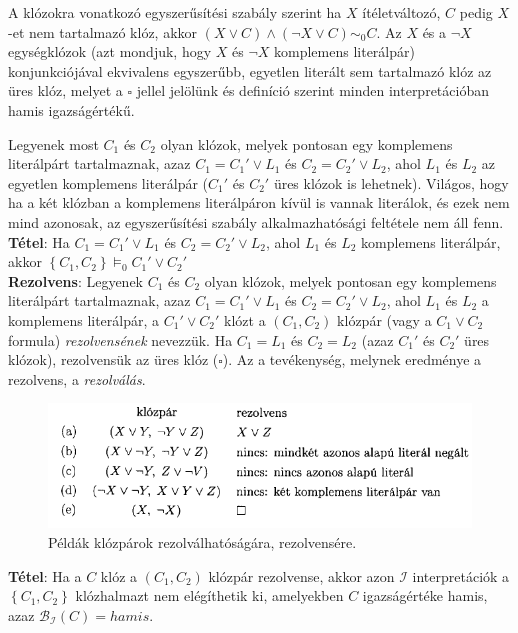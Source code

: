 \documentclass[margin=0px]{article}
\begin{document}
A klózokra vonatkozó egyszerűsítési szabály szerint ha $X$ ítéletváltozó, $C$ pedig $X$-et nem
tartalmazó klóz, akkor $(X \vee C) \wedge (\neg X \vee C) \sim_{0} C$. Az $X$ és a $\neg X$
egységklózok (azt mondjuk, hogy $X$ és $\neg X$ komplemens literálpár) konjunkciójával ekvivalens
egyszerűbb, egyetlen literált sem tartalmazó klóz az üres klóz, melyet a $\square$ jellel
jelölünk és definíció szerint minden interpretációban hamis igazságértékű.

Legyenek most $C_{1}$ és $C_{2}$ olyan klózok, melyek pontosan egy komplemens literálpárt tartalmaznak,
azaz $C_{1} = C_{1}' \vee L_{1}$ és $C_{2} = C_{2}' \vee L_{2}$, ahol $L_{1}$ és $L_{2}$ az egyetlen
komplemens literálpár ($C_{1}'$ és $C_{2}'$ üres klózok is lehetnek). Világos, hogy ha a két klózban
a komplemens literálpáron kívül is vannak literálok, és ezek nem mind azonosak, az egyszerűsítési
szabály alkalmazhatósági feltétele nem áll fenn.\\

\noindent \textbf{Tétel}: Ha $C_{1} = C_{1}' \vee L_{1}$ és $C_{2} = C_{2}' \vee L_{2}$,
ahol $L_{1}$ és $L_{2}$	komplemens literálpár, akkor $\left\{C_{1},C_{2}\right\} \models_{0} C_{1}' \vee C_{2}'$\\

\noindent \textbf{Rezolvens}: Legyenek $C_{1}$ és $C_{2}$ olyan klózok, melyek pontosan egy komplemens literálpárt tartalmaznak,
azaz $C_{1} = C_{1}' \vee L_{1}$ és $C_{2} = C_{2}' \vee L_{2}$, ahol $L_{1}$ és $L_{2}$ a komplemens literálpár,
a $C_{1}' \vee C_{2}'$ klózt a $(C_{1},C_{2})$ klózpár (vagy a $C_{1} \vee C_{2}$ formula) \textit{rezolvensének} nevezzük.
Ha $C_{1} = L_{1}$ és $C_{2} = L_{2}$ (azaz $C_{1}'$ és $C_{2}'$ üres klózok), rezolvensük az üres klóz ($\square$).
Az a tevékenység, melynek eredménye a rezolvens, a \textit{rezolválás}.

\begin{figure}[H]
    \centering
    \includegraphics[width=0.7\linewidth]{img/rezolvens}
    \caption{Példák klózpárok rezolválhatóságára, rezolvensére.}
    \label{fig:rezolvens}
\end{figure}

\noindent \textbf{Tétel}: Ha a $C$ klóz a $(C_{1},C_{2})$ klózpár rezolvense, akkor azon $\mathcal{I}$ interpretációk
a $\left\{C_{1}, C_{2}\right\}$ klózhalmazt nem elégíthetik ki, amelyekben $C$ igazságértéke hamis, azaz
$\mathcal{B}_{\mathcal{I}}(C) = hamis$.\\
\end{document}

